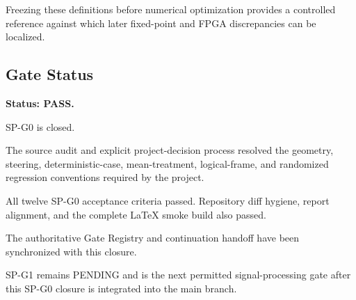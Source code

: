 Freezing these definitions before numerical optimization provides a controlled
reference against which later fixed-point and FPGA discrepancies can be
localized.

\subsection{Gate Status}

\textbf{Status: PASS.}

SP-G0 is closed.

The source audit and explicit project-decision process resolved the geometry,
steering, deterministic-case, mean-treatment, logical-frame, and randomized
regression conventions required by the project.

All twelve SP-G0 acceptance criteria passed. Repository diff hygiene, report
alignment, and the complete LaTeX smoke build also passed.

The authoritative Gate Registry and continuation handoff have been
synchronized with this closure.

SP-G1 remains PENDING and is the next permitted signal-processing gate after
this SP-G0 closure is integrated into the main branch.
